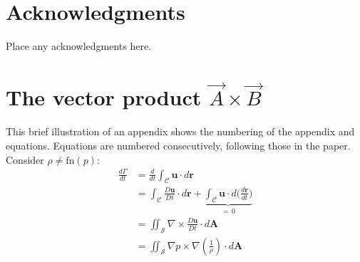 \documentclass[colorlinks,upint,subscriptcorrection,varvw,balance,loadscripts,german,vietamese]{asmeconf} %
\begin{document}

\section*{Acknowledgments}
Place any acknowledgments here.



\nocite{*}%



\appendix


\section[The Vector Product A\times B]{The vector product $\vec{A}\times\vec{B}$}\label{appendix:a}

This brief illustration of an appendix shows the numbering of the appendix and equations. Equations are numbered
consecutively, following those in the paper. Consider $\rho \neq \textrm{fn}(p)$:
\begin{align}
\frac{d\Gamma}{dt} &{}= \frac{d}{dt} \int_{\mathcal{C}} \mathbf{u} \cdot d\mathbf{r}\\
				   &{}= \int_{\mathcal{C}} \frac{D\mathbf{u}}{Dt} \cdot d\mathbf{r} + \underbrace{\int_{\mathcal{C}} \mathbf{u}\cdot d\biggl( \frac{d\mathbf{r}}{dt}\biggr)}_{=\, 0} \\[-2pt]
                   &{}= \iint_{\mathcal{S}} \nabla \times \frac{D\mathbf{u}}{Dt}  \cdot d\mathbf{A}\\
                   &{}= \iint_{\mathcal{S}}  \nabla p \times \nabla \left( \frac{1}{\rho}\right) \cdot d\mathbf{A}
\end{align}
\end{document}

